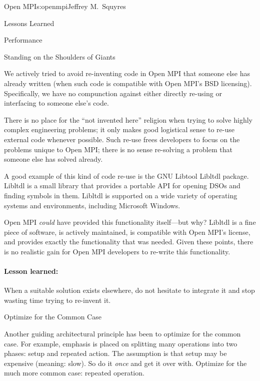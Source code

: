 \begin{aosachapter}{Open MPI}{s:openmpi}{Jeffrey M.\ Squyres}
\begin{aosasect1}{Lessons Learned}
\begin{aosasect2}{Performance}
\end{aosasect2}


\begin{aosasect2}{Standing on the Shoulders of Giants}

We actively tried to avoid re-inventing code in Open MPI that someone
else has already written (when such code is compatible with Open
MPI's BSD licensing).
%
Specifically, we have no compunction against either directly re-using
or interfacing to someone else's code.

There is no place for the ``not invented here'' religion when trying
to solve highly complex engineering problems; it only makes good
logistical sense to re-use external code whenever possible.
%
Such re-use frees developers to focus on the problems unique to Open
MPI; there is no sense re-solving a problem that someone else has
solved already.

A good example of this kind of code re-use is the GNU Libtool Libltdl
package.  Libltdl is a small library that provides a portable API for
opening DSOs and finding symbols in them.  Libltdl is supported on a
wide variety of operating systems and environments, including
Microsoft Windows.

Open MPI \emph{could} have provided this functionality itself---but
why?
%
Libltdl is a fine piece of software, is actively maintained, is
compatible with Open MPI's license, and provides exactly the
functionality that was needed.
%
Given these points, there is no realistic gain for Open MPI developers
to re-write this functionality.


\paragraph{Lesson learned:} 

When a suitable solution exists elsewhere, do not hesitate to integrate
it and stop wasting time trying to re-invent it.

\end{aosasect2}


\begin{aosasect2}{Optimize for the Common Case}

Another guiding architectural principle has been to optimize for the
common case.  
% 
For example, emphasis is placed on splitting many operations into two
phases: setup and repeated action.  The assumption is that setup may
be expensive (meaning: slow).  So do it \emph{once} and get it over
with.
%
Optimize for the much more common case: repeated operation.


\end{aosasect2}
\end{aosasect1}
\end{aosachapter}
